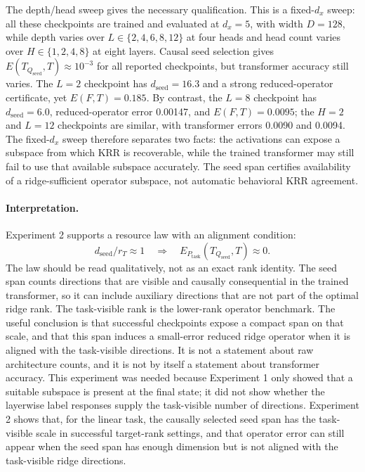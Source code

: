 \documentclass[11pt]{article}
\begin{document}
The depth/head sweep gives the necessary qualification. This is a fixed-\(d_x\) sweep: all these
checkpoints are trained and evaluated at \(d_x=5\), with width \(D=128\), while depth varies over
\(L\in\{2,4,6,8,12\}\) at four heads and head count varies over \(H\in\{1,2,4,8\}\) at eight layers.
Causal seed selection gives \(E(T_{Q_{\mathrm{seed}}},T)\approx10^{-3}\) for all reported checkpoints,
but transformer accuracy still varies. The \(L=2\) checkpoint has \(d_{\mathrm{seed}}=16.3\) and a
strong reduced-operator certificate, yet \(E(F,T)=0.185\). By contrast, the \(L=8\) checkpoint has
\(d_{\mathrm{seed}}=6.0\), reduced-operator error 0.00147, and \(E(F,T)=0.0095\); the \(H=2\) and
\(L=12\) checkpoints are similar, with transformer errors 0.0090 and 0.0094. The fixed-\(d_x\)
sweep therefore separates two facts:
the activations can expose a subspace from which KRR is recoverable, while the trained
transformer may still fail to use that available subspace accurately. The seed span certifies
availability of a ridge-sufficient operator subspace, not automatic behavioral KRR agreement.

\paragraph{Interpretation.}
Experiment 2 supports a resource law with an alignment condition:
\[
d_{\mathrm{seed}}/r_T \approx 1
\quad\Longrightarrow\quad
E_{P_{\mathrm{task}}}(T_{Q_{\mathrm{seed}}},T)\approx 0.
\]
The law should be read qualitatively, not as an exact rank identity. The seed span counts directions
that are visible and causally consequential in the trained transformer, so it can include auxiliary
directions that are not part of the optimal ridge rank. The task-visible rank is the lower-rank
operator benchmark. The useful conclusion is that successful checkpoints expose a compact span on
that scale, and that this span induces a small-error reduced ridge operator when it is aligned with
the task-visible directions. It is not a statement about raw architecture counts, and it is not by
itself a statement about transformer accuracy.
This experiment was needed because Experiment 1 only showed that a suitable subspace is present
at the final state; it did not show whether the layerwise label responses supply the task-visible
number of directions. Experiment 2 shows that, for the linear task, the causally selected seed span
has the task-visible scale in successful target-rank settings, and that operator error can still
appear when the seed span has enough dimension but is not aligned with the task-visible ridge
directions.
\end{document}

